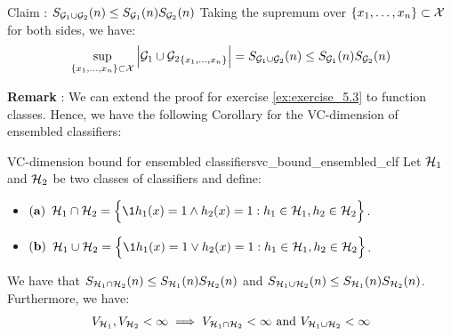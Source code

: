 \begin{solution*}
\begin{subproof}{\newline Claim : $S_{\mathcal{G}_1 \cup \mathcal{G}_2}(n) \le S_{\mathcal{G}_1}(n)S_{\mathcal{G}_2}(n)$}
        \noindent Taking the supremum over $\{x_1, \dots, x_n\}\subset\mathcal{X}$ for both sides, we have:
        \begin{align*}
            \sup_{\{x_1, \dots, x_n\}\subset\mathcal{X}} \Big| {\mathcal{G}_1 \cup \mathcal{G}_2}_{\{x_1, \dots, x_n \}} \Big| = S_{\mathcal{G}_1\cup\mathcal{G}_2}(n) \le S_{\mathcal{G}_1}(n)S_{\mathcal{G}_2}(n)
        \end{align*}
    \end{subproof}
\end{solution*}

\noindent \textbf{Remark} : We can extend the proof for exercise \ref{ex:exercise_5.3} to function classes. Hence, we have the following Corollary for the VC-dimension of ensembled classifiers:

\begin{corollary}{VC-dimension bound for ensembled classifiers}{vc_bound_ensembled_clf}
    Let $\mathcal{H}_1$ and $\mathcal{H}_2$ be two classes of classifiers and define:
    \begin{itemize}
        \item $(\bf a)$ $\Hf_1\cap\Hf_2 = \bigCurl{ \1{h_1(x)=1 \wedge h_2(x)=1} : h_1 \in \Hf_1, h_2\in\Hf_2 }$.
        \item $(\bf b)$ $\Hf_1\cup\Hf_2 = \bigCurl{ \1{h_1(x)=1 \vee h_2(x)=1} : h_1 \in \Hf_1, h_2\in\Hf_2 }$.
    \end{itemize}

    \noindent We have that $S_{\mathcal{H}_1\cap\mathcal{H}_2}(n)\le S_{\mathcal{H}_1}(n)S_{\mathcal{H}_2}(n)$ and $S_{\mathcal{H}_1\cup\mathcal{H}_2}(n)\le S_{\mathcal{H}_1}(n)S_{\mathcal{H}_2}(n)$. Furthermore, we have:
    \begin{align*}
        V_{\mathcal{H}_1}, V_{\mathcal{H}_2} < \infty \implies V_{\mathcal{H}_1\cap\mathcal{H}_2} < \infty \text{ and } V_{\mathcal{H}_1\cup\mathcal{H}_2} < \infty
    \end{align*}
\end{corollary}

